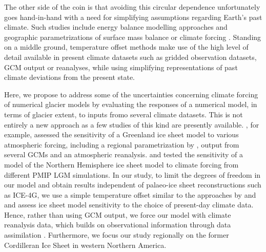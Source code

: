 The other side of the coin is that avoiding this circular dependence unfortunately goes hand-in-hand with a need for simplifying assumptions regarding Earth's past climate. Such studies include energy balance modelling approaches \citep{tarasov-peltier-1997} and geographic parametrizations of surface mass balance \citep{robert-1991} or climate forcing \citep{johnson-fastook-2002}. Standing on a middle ground, temperature offset methods \citep{greve-etal-1999,bintanja-etal-2005} make use of the high level of detail available in present climate datasets such as gridded observation datasets, GCM output or reanalyses, while using simplifying representations of past climate deviations from the present state.

Here, we propose to address some of the uncertainties concerning climate forcing of numerical glacier models by evaluating the responses of a numerical model, in terms of glacier extent, to inputs fromo several climate datasets. This is not entirely a new approach as a few studies of this kind are presently available. \citet{quiquet-etal-2012}, for example, assessed the sensitivity of a Greenland ice sheet model to various atmospheric forcing, including a regional parametrization by \citet{fausto-etal-2009}, output from several GCMs and an atmospheric reanalysis. \citet{rodgers-etal-2004} and \citet{charbit-etal-2007} tested the sensitivity of a model of the Northern Hemisphere ice sheet model to climate forcing from different PMIP LGM simulations. In our study, to limit the degrees of freedom in our model and obtain results independent of palaeo-ice sheet reconstructions such as ICE-4G, we use a simple temperature offset similar to the approaches by \citet{greve-etal-1999} and \citet{bintanja-etal-2005} and assess ice sheet model sensitivity to the choice of present-day climate data. Hence, rather than using GCM output, we force our model with climate reanalysis data, which builds on observational information through data assimilation \citep{bengtsson-etal-2007}. Furthermore, we focus our study regionally on the former Cordilleran Ice Sheet in western Northern America.

